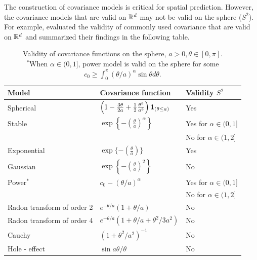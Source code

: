 The construction of covariance models is critical for spatial prediction. However, the covariance models that are valid on $\mathbb{R}^d$ may not be valid on the sphere ($S^2$). For example, \cite{HuangZhangRobeson2011} evaluated the validity of commonly used covariance that are valid on $\mathbb{R}^d$ and summarized their findings in the following table.

	\begin{table}[H]
		\label{valid_cov_models}
		\centering
		\begin{tabular}[htb]{lll} \hline \hline
			Model & Covariance function & Validity  $S^2$           \\   \hline Spherical  &
			$\left(1-\frac{3\theta}{2a} + \frac{1}{2}
			\frac{\theta^3}{a^3}\right){\bf 1}_{(\theta \le a)}$ & Yes   \\
			[2ex]
			Stable     & $\exp\left\{-\left(\frac{\theta}{a}\right)^\alpha\right\}$ & Yes for $\alpha \in (0,1]$  \\
			      &                     & No for $\alpha \in (1,2]$ \\ [2ex] \hspace{0.2in} Exponential &
			$\exp \{-\left(\frac{\theta}{a}\right) \}$ & Yes \\ [2ex]
			\hspace{0.2in} Gaussian & $\exp\left\{-\left(\frac{\theta}{a} \right)^2
			\right\}$  & No \\ [2ex]
			Power$^*$   & $c_0 - (\theta/a)^\alpha$ & Yes for  $\alpha \in (0,1] $  \\
			& & No for $\alpha \in (1,2]$ \\ [2ex]
			Radon transform of order 2         & $e^{-\theta/a}(1+\theta/a)$ &
			No        \\ [2ex] Radon transform of order 4         &
			$e^{-\theta/a} (1+\theta/a+\theta^2/3a^2)$  & No  \\ [2ex] Cauchy &
			$(1+\theta^2/a^2)^{-1}$ &  No      \\ [2ex] Hole - effect & $\sin
			a\theta / \theta$ & No    \\ \hline \hline
		\end{tabular}
		\caption [Validity of covariance functions on the sphere]{Validity of covariance functions on the sphere, $a >0,\theta \in [0,\pi]$.\\
		$^*$When $\alpha \in (0,1]$, power model is valid on the sphere  for some $c_0 \ge \int_0^\pi
				(\theta/a)^{\alpha} \sin \theta d \theta$.} \label{tab:cov_sphere}				
		\end{table}
			
